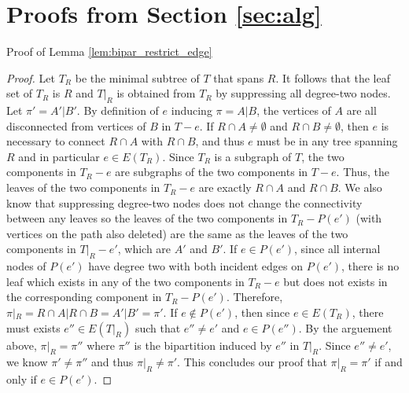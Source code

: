 \documentclass{bmcart}
\newtheorem{theorem}{Theorem}
\begin{document}


\appendix
\section{Proofs from Section \ref{sec:alg}}

Proof of Lemma \ref{lem:bipar_restrict_edge}
\begin{proof}
Let $T_R$ be the minimal subtree of $T$ that spans $R$. It follows that the leaf set of $T_R$ is $R$ and $T|_R$ is obtained from $T_R$ by suppressing all degree-two nodes. Let $\pi' = A'|B'$.
By definition of $e$ inducing $\pi = A|B$, the vertices of $A$ are all disconnected from vertices of $B$ in $T-e$. If $R\cap A \neq \emptyset$ and $R\cap B \neq \emptyset$, then $e$ is necessary to connect $R\cap A$ with $R \cap B$, and thus $e$ must be in any tree spanning $R$ and in particular $e \in E(T_R)$. Since $T_R$ is a subgraph of $T$, the two components in $T_R-e$ are subgraphs of the two components in $T-e$. Thus, the leaves of the two components in $T_R-e$ are exactly $R\cap A$ and $R\cap B$. We also know that suppressing degree-two nodes does not change the connectivity between any leaves so the leaves of the two components in $T_R - P(e')$ (with vertices on the path also deleted) are the same as the leaves of the two components in $T|_R - e'$, which are $A'$ and $B'$. If $e \in P(e')$, since all internal nodes of $P(e')$ have degree two with both incident edges on $P(e')$, there is no leaf which exists in any of the two components in $T_R - e$ but does not exists in the corresponding component in $T_R-P(e')$. Therefore, $\pi|_R = R\cap A|R\cap B = A'|B' = \pi'$. If $e \notin P(e')$, then since $e \in E(T_R)$, there must exists $e'' \in E(T|_R)$ such that $e'' \neq e'$ and $e \in P(e'')$. By the arguement above, $\pi|_R = \pi''$ where $\pi''$ is the bipartition induced by $e''$ in $T|_R$. Since $e'' \neq e'$, we know $\pi' \neq \pi''$ and thus $\pi|_R \neq \pi'$. This concludes our proof that $\pi|_R = \pi'$ if and only if $e \in P(e')$. 
\end{proof}
\end{document}
